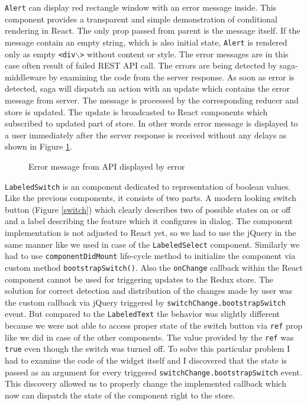 \texttt{Alert} can display red rectangle window with an error message inside. This component provides a transparent and simple demonstration of conditional rendering in React. The only prop passed from parent is the message itself. If the message contain an empty string, which is also initial state, \texttt{Alert} is rendered only as empty \texttt{<div$\backslash$>} without content or style. 
The error messages are in this case often result of failed REST API call. The errors are being detected by saga-middleware by examining the code from the server response. As soon as error is detected, saga will dispatch an action with an update which contains the error message from server. The message is processed by the corresponding reducer and store is updated. The update is broadcasted to React components which subscribed to updated part of store. In other words error message is displayed to a user immediately after the server response is received without any delays as shown in Figure \ref{alert}.

\begin{figure}[h]
\caption{Error message from API displayed by error}
\label{alert}
\end{figure}

\texttt{LabeledSwitch} is an component dedicated to representation of boolean values. Like the previous components, it consists of two parts. A modern looking switch button (Figure \ref{switch}) which clearly describes two of possible states on or off and a label describing the feature which it configures in dialog. The component implementation is not adjusted to React yet, so we had to use the jQuery in the same manner like  we used in case of the \texttt{LabeledSelect} component. Similarly we had to use \texttt{componentDidMount} life-cycle method to initialize the component via custom method \texttt{bootstrapSwitch()}. Also the \texttt{onChange} callback within the React component cannot be used for triggering updates to the Redux store. The solution for correct detection and distribution of the changes made by user was the custom callback via jQuery triggered by \texttt{switchChange.bootstrapSwitch} event. But compared to the \texttt{LabeledText} the behavior was slightly different because we were not able to access proper state of the switch button via \texttt{ref} prop like we did in case of the other components. The value provided by the \texttt{ref} was \texttt{true} even though the switch was turned off. To solve this particular problem I had to examine the code of the widget itself and I discovered that the state is passed as an argument for every triggered \texttt{switchChange.bootstrapSwitch} event. This discovery allowed us to properly change the implemented callback which now can dispatch the state of the component right to the store.

